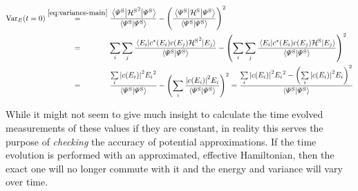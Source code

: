 \begin{equation}
    \label{eq:variance-constant}
    \begin{split}
        \varianceOft[t=0] &\stackrel{\ref{eq:variance-main}}{=} \frac{\bracketHelper{\picturePsi[\schroedingerPicture]{}}{{\pictureHamiltonian[\schroedingerPicture]}^2}{\picturePsi[\schroedingerPicture]{}}}{\braketHelper{\picturePsi[\schroedingerPicture]{}}{\picturePsi[\schroedingerPicture]{}}}-\left(\frac{\bracketHelper{\picturePsi[\schroedingerPicture]{}}{\pictureHamiltonian[\schroedingerPicture]}{\picturePsi[\schroedingerPicture]{}}}{\braketHelper{\picturePsi[\schroedingerPicture]{}}{\picturePsi[\schroedingerPicture]{}}}\right)^2
        \\ &\stackrel{\phantom{\ref{eq:variance-main}}}{=} 
        \lsum[i]
        \lsum[j]
        \frac{\bracketHelper{E_i}{c^\ast(E_i)c(E_j){\pictureHamiltonian[\schroedingerPicture]}^2}{E_j}}{\braketHelper{\picturePsi[\schroedingerPicture]{}}{\picturePsi[\schroedingerPicture]{}}}
        -\left(
            \lsum[i]
            \lsum[j]
            \frac{\bracketHelper{E_i}{c^\ast(E_i)c(E_j)\pictureHamiltonian[\schroedingerPicture]}{E_j}}{\braketHelper{\picturePsi[\schroedingerPicture]{}}{\picturePsi[\schroedingerPicture]{}}}
        \right)^2
        \\ &\stackrel{\phantom{\ref{eq:variance-main}}}{=} 
        \frac{
            \lsum[i]
            \absSquare{c(E_i)}{E_i}^2}{\braketHelper{\picturePsi[\schroedingerPicture]{}}{\picturePsi[\schroedingerPicture]{}}}
        -\left(
            \lsum[i]
            \frac{\absSquare{c(E_i)}E_i}{\braketHelper{\picturePsi[\schroedingerPicture]{}}{\picturePsi[\schroedingerPicture]{}}}
        \right)^2
        =
        \frac{
            \lsum[i]
            \absSquare{c(E_i)}{E_i}^2 
            -\left(
                \lsum[i]
                \absSquare{c(E_i)}E_i
            \right)^2
        }{\braketHelper{\picturePsi[\schroedingerPicture]{}}{\picturePsi[\schroedingerPicture]{}}}
    \end{split}
\end{equation}

While it might not seem to give much insight to calculate the time evolved measurements of these values if they are constant, in reality this serves the purpose of \emph{checking} the accuracy of potential approximations.
If the time evolution is performed with an approximated, effective Hamiltonian, then the exact one will no longer commute with it and the energy and variance will vary over time.

